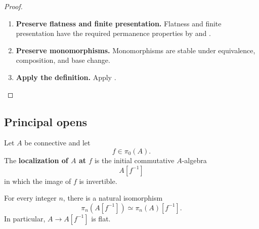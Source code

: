 \begin{proof}
\leavevmode
\begin{enumerate}[label=\textup{(\arabic*)}]
    \item \textbf{Preserve flatness and finite presentation.}
    Flatness and finite presentation have the required permanence properties
    by  and
    .

    \item \textbf{Preserve monomorphisms.}
    Monomorphisms are stable under
    equivalence, composition, and base change.

    \item \textbf{Apply the definition.}
    Apply
    .
\end{enumerate}
\end{proof}

\subsection{Principal opens}

\begin{construction}
\label{con:spectral-localization}
Let $A$ be connective and let
\[
    f\in\pi_0(A).
\]
The \textbf{localization of $A$ at $f$} is the initial commutative
$A$-algebra
\[
    A[f^{-1}]
\]
in which the image of $f$ is invertible.
\end{construction}

\begin{proposition}
\label{prop:homotopy-groups-localization}
For every integer $n$, there is a natural isomorphism
\[
    \pi_n(A[f^{-1}])
    \simeq
    \pi_n(A)[f^{-1}].
\]
In particular, $A\to A[f^{-1}]$ is flat.
\end{proposition}

